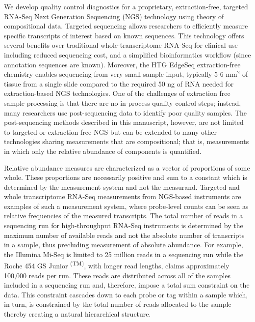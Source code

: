 
We develop quality control diagnostics for a proprietary, extraction-free,  targeted RNA-Seq Next Generation Sequencing (NGS) technology using theory of compositional data.  Targeted sequencing allows researchers to efficiently measure specific transcripts of interest based on known sequences.  This technology offers several benefits over traditional whole-transcriptome RNA-Seq for clinical use including reduced sequencing cost, and a simplified bioinformatics workflow (since annotation sequences are known).  Moreover, the HTG EdgeSeq extraction-free chemistry  enables sequencing from very small sample input, typically 5-6 mm$^2$ of tissue from a single slide compared to the required 50 ng of RNA needed for extraction-based NGS technologies. One of the challenges of extraction free  sample processing is that there are no in-process quality control steps; instead, many researchers use post-sequencing data to identify poor quality samples. The post-sequencing methods described in this manuscript, however, are not limited to targeted or extraction-free NGS but can be extended to many other technologies sharing measurements that are compositional; that is, measurements in which only the relative abundance of components is quantified.


Relative abundance measures are characterized as a vector of proportions of some whole.  These proportions are necessarily positive and sum to a constant which is determined by the measurement system and not the measurand.  
Targeted and whole transcriptome RNA-Seq measurements from NGS-based instruments are examples of such a measurement system, where probe-level counts can be seen as relative frequencies of the measured transcripts.   The total number of reads in a sequencing run for high-throughput RNA-Seq instruments is determined by the maximum number of available reads and not the absolute number of transcripts in a sample, thus precluding measurement of absolute abundance.  For example, the Illumina Mi-Seq is limited to 25 million reads in a sequencing run while the Roche 454 GS Junior \textsuperscript{(TM)}, with longer read lengths, claims approximately 100,000 reads per run.  These reads are distributed across all of the samples included in a sequencing run and, therefore, impose a total sum constraint on the data.  This constraint cascades down to each probe or tag within a sample which, in turn, is constrained by the total number of reads allocated to the sample thereby creating a natural hierarchical structure.

